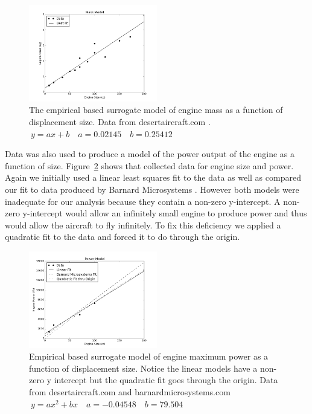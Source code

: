 \documentclass[letterpaper, 10 pt, conference]{ieeeconf}  %
\begin{document}
\begin{figure}
	\includegraphics[width=0.5\textwidth]{mass.png}
	\caption{The empirical based surrogate model of engine mass as a function of displacement size. Data from desertaircraft.com \cite{da2016}. $\ y = ax + b \quad a = 0.02145 \quad b = 0.25412$}
		\label{fig:mass}
\end{figure}

Data was also used to produce a model of the power output of the engine as a function of size. Figure~\ref{fig:power} shows that collected data for engine size and power.  Again we initially used a linear least squares fit to the data as well as compared our fit to data produced by Barnard Microsystems \cite{barnardmiro2016}. However both models were inadequate for our analysis because they contain a non-zero y-intercept.  A non-zero y-intercept would allow an infinitely small engine to produce power and thus would allow the aircraft to fly infinitely. To fix this deficiency we applied a quadratic fit to the data and forced it to do through the origin.

\begin{figure}
	\includegraphics[width=0.5\textwidth]{max_power.png}
	\caption{Empirical based surrogate model of engine maximum power as a function of displacement size. Notice the linear models have a non-zero y intercept but the quadratic fit goes through the origin. Data from desertaircraft.com \cite{da2016} and barnardmicrosystems.com \cite{barnardmiro2016} $\ y = ax^2 + bx \quad a = -0.04548 \quad b = 79.504$}
		\label{fig:power}
\end{figure}
\end{document}
